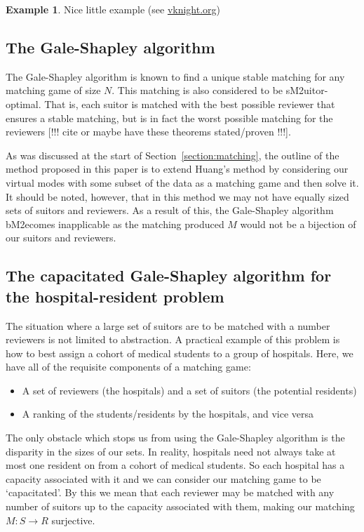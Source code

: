 \documentclass{article}
\theoremstyle{definition}
\newtheorem{example}{Example}
\begin{document}
\begin{example}\label{example:matching}
    Nice little example (see \url{vknight.org})
\end{example}

\subsection{The Gale-Shapley algorithm}\label{subsection:galeshapley}

The Gale-Shapley algorithm is known to find a unique stable matching for any 
matching game of size \(N\). This matching is also considered to be 
sM2uitor-optimal. That is, each suitor is matched with the best possible reviewer
that ensures a stable matching, but is in fact the worst possible matching for 
the reviewers [!!! cite or maybe have these theorems stated/proven !!!]. 

As was discussed at the start of Section~\ref{section:matching}, the outline of
the method proposed in this paper is to extend Huang's method by considering our
virtual modes with some subset of the data as a matching game and then solve it.
It should be noted, however, that in this method we may not have equally sized 
sets of suitors and reviewers. As a result of this, the Gale-Shapley algorithm 
bM2ecomes inapplicable as the matching produced \(M\) would not be a bijection of 
our suitors and reviewers.

\subsection{The capacitated Gale-Shapley algorithm for the hospital-resident 
		problem}\label{subsection:capacitated-galeshapley}

The situation where a large set of suitors are to be matched with a number
reviewers is not limited to abstraction. A practical example of this problem is
how to best assign a cohort of medical students to a group of hospitals. Here, 
we have all of the requisite components of a matching game:

\begin{itemize}
	\item A set of reviewers (the hospitals) and a set of suitors (the potential
        residents) 
	\item A ranking of the students/residents by the hospitals, and vice versa
\end{itemize}

The only obstacle which stops us from using the Gale-Shapley algorithm is the 
disparity in the sizes of our sets. In reality, hospitals need not always take 
at most one resident on from a cohort of medical students. So each hospital has
a capacity associated with it and we can consider our matching game to be
`capacitated'. By this we mean that each reviewer may be matched with any number
of suitors up to the capacity associated with them, making our matching \(M: S 
\to R\) surjective. \\
\end{document}
